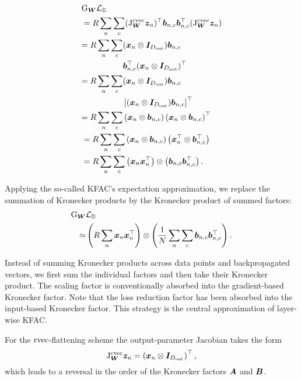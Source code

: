 \begin{align*}
  &\mathrm{G}_{{\bm{W}}} {\mathcal{L}}_{{\mathbb{D}}} \\
  &= R \sum_n \sum_c
  (\mathrm{J}^{\operatorname{cvec}}_{{\bm{W}}}{\bm{z}}_n)^{\top}
  {\bm{b}}_{n,c} {\bm{b}}_{n,c}^{\top}
  (\mathrm{J}^{\operatorname{cvec}}_{{\bm{W}}}{\bm{z}}_n) \\
  &\begin{aligned}
  = R \sum_n \sum_c &({\bm{x}}_n \otimes {\bm{I}}_{D_{\text{out}}}) {\bm{b}}_{n,c} \\
  & {\bm{b}}_{n,c}^{\top} ({\bm{x}}_n \otimes {\bm{I}}_{D_{\text{out}}})^{\top} 
  \end{aligned}\\
  &\begin{aligned}
  = R \sum_n \sum_c &({\bm{x}}_n \otimes {\bm{I}}_{D_{\text{out}}}) {\bm{b}}_{n,c} \\
  &\left[({\bm{x}}_n \otimes {\bm{I}}_{D_{\text{out}}}) {\bm{b}}_{n,c} \right]^{\top}
  \end{aligned}\\
  &\begin{aligned}
  = R \sum_n \sum_c &\left( {\bm{x}}_n \otimes {\bm{b}}_{n,c} \right)\left( {\bm{x}}_n \otimes {\bm{b}}_{n,c} \right)^{\top}
  \end{aligned}\\
  &= R \sum_n \sum_c \left( {\bm{x}}_n \otimes {\bm{b}}_{n,c} \right)
  \left( {\bm{x}}_n^{\top} \otimes {\bm{b}}_{n,c}^{\top} \right) \\
  &= R \sum_n \sum_c \left({\bm{x}}_n {\bm{x}}_n^{\top}\right) \otimes \left({\bm{b}}_{n,c} {\bm{b}}_{n,c}^{\top}\right).
\end{align*}

Applying the so-called KFAC's expectation approximation, we replace the summation of Kronecker products by the Kronecker product of summed factors:
\begin{align*}
  \mathrm{G}_{{\bm{W}}}&{\mathcal{L}}_{{\mathbb{D}}} \\
  \approx& \left( R \sum_n {\bm{x}}_n {\bm{x}}_n^{\top} \right) \otimes \left( \frac{1}{N} \sum_n \sum_c {\bm{b}}_{n,c} {\bm{b}}_{n,c}^{\top} \right).
\end{align*}

Instead of summing Kronecker products across data points and backpropagated vectors, we first sum the individual factors and then take their Kronecker product. The scaling factor is conventionally absorbed into the gradient-based Kronecker factor.
Note that the loss reduction factor has been absorbed into the input-based Kronecker factor.
This strategy is the central approximation of layer-wise KFAC.

For the $\operatorname{rvec}$-flattening scheme the output-parameter Jacobian takes the form
$$ \mathrm{J}^{\operatorname{cvec}}_{{\bm{W}}}{\bm{z}}_n = \left({\bm{x}}_n \otimes {\bm{I}}_{D_{\text{out}}}\right)^{\top},$$
which leads to a reversal in the order of the Kronecker factors ${\bm{A}}$ and ${\bm{B}}$.

